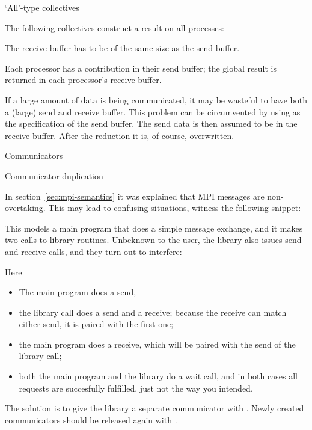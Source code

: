  {`All'-type collectives}

The following collectives construct a result on all processes:
%
%
%
\begin{pythonnote}
  The receive buffer has to be of the same size as the send buffer.
\end{pythonnote}

Each processor has a contribution in their send buffer; the global result
is returned in each processor's receive buffer.

If a large amount of data is being communicated, it may be wasteful to 
have both a (large) send and receive buffer.
This problem can be circumvented by using 
as the specification of the send buffer. The send data is then
assumed to be in the receive buffer. After the reduction it is, of course,
overwritten.

 {Communicators}

 {Communicator duplication}

In section~\ref{sec:mpi-semantics} it was explained that MPI messages are 
non-overtaking. This may lead to confusing situations, witness the following snippet:


This models a main program that does a simple message exchange, and it
makes two calls to library routines. Unbeknown to the user, the
library also issues send and receive calls, and they turn out to
interfere:


Here
\begin{itemize}
\item The main program does a send,
\item the library call  does a send and a receive;
  because the receive can match either send, it is paired with the
  first one;
\item the main program does a receive, which will be paired with the send of the 
  library call;
\item both the main program and the library do a wait call, and in
  both cases all requests are succesfully fulfilled, just not the way
  you intended.
\end{itemize}

The solution is to give the library a separate communicator with
.
%
%
Newly created communicators should be
released again with .

